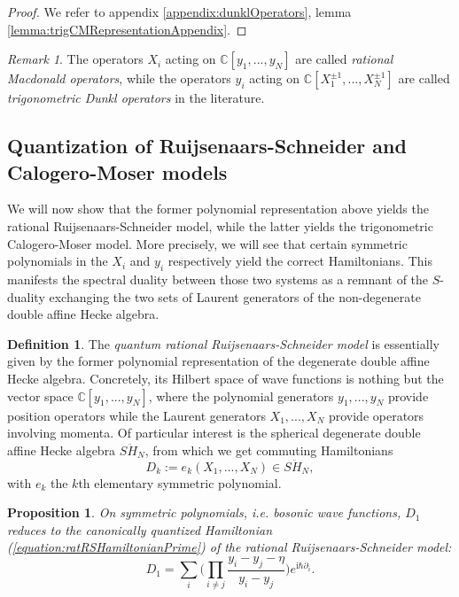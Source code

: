 \documentclass[11pt]{report}
\newtheorem{prop}[theorem]{Proposition}
\theoremstyle{definition}
\newtheorem{definition}[theorem]{Definition}
\theoremstyle{remark}
\newtheorem*{remark}{Remark}
\theoremstyle{remark}
\newcommand{\C}{\mathbb{C}}
\newcommand{\I}{\mathrm{i}}
\begin{document}
\begin{proof}
We refer to appendix \ref{appendix:dunklOperators}, lemma \ref{lemma:trigCMRepresentationAppendix}.
\end{proof}

\begin{remark}
The operators $X_i$ acting on $\C[y_1,...,y_N]$ are called \emph{rational Macdonald operators}, while the operators $y_i$ acting on $\C[X_1^{\pm 1},...,X_N^{\pm 1}]$ are called \emph{trigonometric Dunkl operators} in the literature.
\end{remark}

\subsection{Quantization of Ruijsenaars-Schneider and Calogero-Moser models}

We will now show that the former polynomial representation above yields the rational Ruijsenaars-Schneider model, while the latter yields the trigonometric Calogero-Moser model. More precisely, we will see that certain symmetric polynomials in the $X_i$ and $y_i$ respectively yield the correct Hamiltonians. This manifests the spectral duality between those two systems \cite{article:chalykh:2000} as a remnant of the $S$-duality exchanging the two sets of Laurent generators of the non-degenerate double affine Hecke algebra.

\begin{definition}
The \emph{quantum rational Ruijsenaars-Schneider model} is essentially given by the former polynomial representation of the degenerate double affine Hecke algebra. Concretely, its Hilbert space of wave functions is nothing but the vector space $\C[y_1,...,y_N]$, where the polynomial generators $y_1,...,y_N$ provide position operators while the Laurent generators $X_1,...,X_N$ provide operators involving momenta. Of particular interest is the spherical degenerate double affine Hecke algebra $S\ddot H_N$, from which we get commuting Hamiltonians
\begin{equation*}
D_k := e_k(X_1,...,X_N) \in S\ddot H_N,
\end{equation*}
with $e_k$ the $k$th elementary symmetric polynomial.
\end{definition}

\begin{prop}
On symmetric polynomials, \emph{i.e.} bosonic wave functions, $D_1$ reduces to the canonically quantized Hamiltonian (\ref{equation:ratRSHamiltonianPrime}) of the rational Ruijsenaars-Schneider model:
\begin{equation*}
D_1 = \sum_i \bigg( \prod_{i \neq j} \frac{y_i-y_j-\eta}{y_i-y_j} \bigg) e^{\I \hbar \partial_i}.
\end{equation*}
\end{prop}
\end{document}

